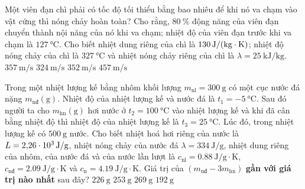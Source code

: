 \begin{ex}
Một viên đạn chì phải có tốc độ tối thiểu bằng bao nhiêu để khi nó va chạm vào vật cứng thì nóng chảy hoàn toàn? Cho rằng, $\SI{80}{\percent}$ động năng của viên đạn chuyển thành nội năng của nó khi va chạm; nhiệt độ của viên đạn trước khi va chạm là $\SI{127}{\celsius}$. Cho biết nhiệt dung riêng của chì là $\SI{130}{\joule/\left(\kilogram\cdot\kelvin\right)}$; nhiệt độ nóng chảy của chì là $\SI{327}{\celsius}$ và nhiệt nóng chảy riêng của chì là $\lambda=\SI{25}{\kilo\joule/\kilogram}$.
	\choice
	{\True $\SI{357}{\meter/\second}$}
	{$\SI{324}{\meter/\second}$}
	{$\SI{352}{\meter/\second}$}
	{$\SI{457}{\meter/\second}$}
\end{ex}
\begin{ex}
	Trong một nhiệt lượng kế bằng nhôm khối lượng $m_\text{nl}=\SI{300}{\gram}$ có một cục nước đá nặng $m_\text{nđ}\left(\si{\gram}\right)$. Nhiệt độ của nhiệt lượng kế và nước đá là $t_1=\SI{-5}{\celsius}$. Sau đó người ta cho $m_\text{hn}\left(\si{\gram}\right)$ hơi nước ở $t_2=\SI{100}{\celsius}$ vào nhiệt lượng kế và khi đã cân bằng nhiệt độ thì nhiệt độ của nhiệt lượng kế là $t_3=\SI{25}{\celsius}$. Lúc đó, trong nhiệt lượng kế có $\SI{500}{\gram}$ nước. Cho biết nhiệt hoá hơi riêng của nước là $L=\SI{2.26E3}{\joule/\gram}$, nhiệt nóng chảy của nước đá $\lambda=\SI{334}{\joule/\gram}$, nhiệt dung riêng của nhôm, của nước đá và của nước lần lượt là $c_\text{nl}=\SI{0.88}{\joule/\gram\cdot\kelvin}$, $c_\text{nđ}=\SI{2.09}{\joule/\gram\cdot\kelvin}$ và $c_\text{n}=\SI{4.19}{\joule/\gram\cdot\kelvin}$. Giá trị của $\left(m_\text{nđ}-3m_\text{hn}\right)$ \textbf{gần với giá trị nào nhất} sau đây?
	\choice
	{$\SI{226}{\gram}$}
	{$\SI{253}{\gram}$}
	{$\SI{269}{\gram}$}
	{\True $\SI{192}{\gram}$}
\end{ex}
